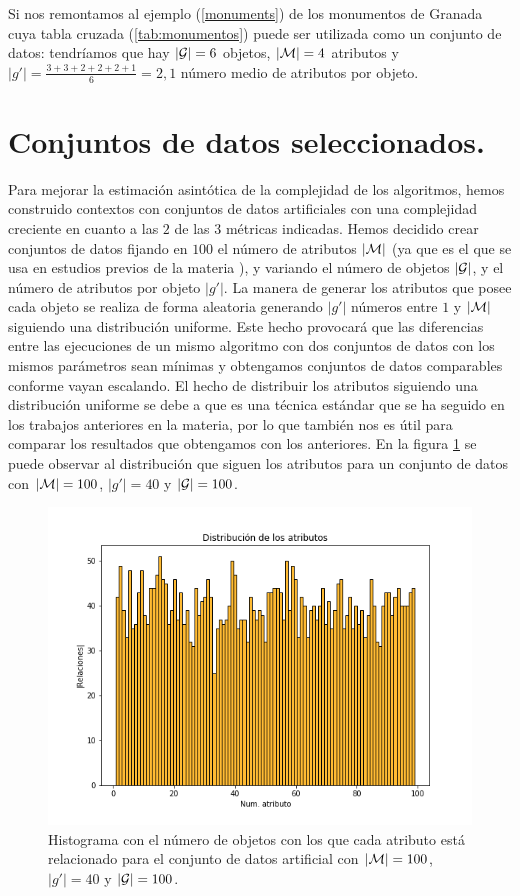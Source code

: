 \documentclass[oneside,openright,titlepage,numbers=noenddot,openany,headinclude,footinclude=true,
cleardoublepage=empty,abstractoff,BCOR=5mm,paper=a4,fontsize=12pt,main=spanish]{scrreprt}
\begin{document}
Si nos remontamos al ejemplo (\ref{monuments}) de los monumentos de Granada cuya tabla cruzada (\ref{tab:monumentos}) puede ser utilizada como un conjunto de datos: tendríamos que hay $|\mathcal{G}|=6$ objetos, $|\mathcal{M}|=4$ atributos y $|g'|=\frac{3+3+2+2+2+1}{6}=2,1$ número medio de atributos por objeto.

\section{Conjuntos de datos seleccionados.}

Para mejorar la estimación asintótica de la complejidad de los algoritmos, hemos construido contextos con conjuntos de datos artificiales con una complejidad creciente en cuanto a las $2$ de las $3$ métricas indicadas. Hemos decidido crear conjuntos de datos fijando en $100$ el número de atributos $|\mathcal{M}|$ (ya que es el que se usa en estudios previos de la materia \cite{comparingperformance}), y variando el número de objetos $|\mathcal{G}|$, y el número de atributos por objeto $|g'|$. La manera de generar los atributos que posee cada objeto se realiza de forma aleatoria generando $|g'|$ números entre $1$ y $|\mathcal{M}|$  siguiendo una distribución uniforme. Este hecho provocará que las diferencias entre las ejecuciones de un mismo algoritmo con dos conjuntos de datos con los mismos parámetros sean mínimas y obtengamos conjuntos de datos comparables conforme vayan escalando. El hecho de distribuir los atributos siguiendo una distribución uniforme se debe a que es una técnica estándar que se ha seguido en los trabajos anteriores en la materia, por lo que también nos es útil para comparar los resultados que obtengamos con los anteriores.  En la figura \ref{fig:distrartg40G100} se puede observar al distribución que siguen los atributos para un conjunto de datos con $|\mathcal{M}|=100$, $|g'|=40$ y $|\mathcal{G}|=100$.


\begin{figure}[H]
  \centering
  \includegraphics[scale=0.6]{images/distribution-artificialg40G100.png}
 
\caption{Histograma con el número de objetos con los que cada atributo está relacionado para el conjunto de datos artificial con $|\mathcal{M}|=100$, $|g'|=40$ y $|\mathcal{G}|=100$.}
 \label{fig:distrartg40G100}
\end{figure}
\end{document}
